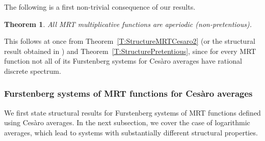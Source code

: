 \documentclass[11pt]{amsart}
\newtheorem{theorem}[lemma]{Theorem}
\theoremstyle{definition}
\newcommand{\N}{{\mathbb N}}
\newcommand{\Z}{{\mathbb Z}}
\begin{document}
The following is a first non-trivial    consequence of our results.
\begin{theorem}\label{T:aperiodic}
	All MRT multiplicative functions are aperiodic (non-pretentious).
\end{theorem}
 This  follows at once from   Theorem~\ref{T:StructureMRTCesaro2} (or the structural result obtained in \cite{GLR21}) and Theorem~\ref{T:StructurePretentious},  since for every MRT function not all of its Furstenberg systems for Ces\`aro averages have rational discrete spectrum.

	










\subsubsection{Furstenberg systems of MRT functions for Ces\`aro averages}
We first state structural results for  Furstenberg systems of MRT functions defined using Ces\`aro averages. In the next subsection, we cover  the case of logarithmic averages, which lead to systems with substantially different structural properties.
\end{document}
